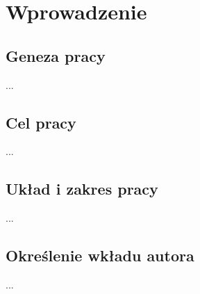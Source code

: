 \chapter*{Wprowadzenie}

\section*{Geneza pracy}

...
\\

\section*{Cel pracy}

...
\\

\section*{Układ i zakres pracy}

...
\\

\section*{Określenie wkładu autora} %

...
\\
